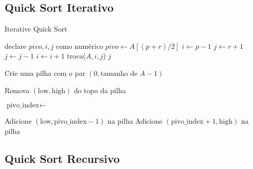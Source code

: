 \subsection{Quick Sort Iterativo}

\begin{algorithm}
	\caption{Iterative Quick Sort}
	\label{algo:iterative_quick_sort}
	\begin{algorithmic}[1]
		\Statex

		\State declare $pivo, i, j$ como numérico
		\State $pivo \gets A[(p + r) / 2]$
		\State $i \gets p - 1$
		\State $j \gets r + 1$
		\Repeat
		\State $j \gets j - 1$
		\Repeat
		\State $i \gets i + 1$
		\State troca($A, i, j$)
		\EndIf
		\EndWhile
		\State \Return $j$
		\EndFunction
		\Statex

		\State \Return
		\EndIf
		\State Crie uma pilha com o par $(0, \text{tamanho de } A - 1)$

		\State Remova $(\text{low}, \text{high})$ do topo da pilha

		\State $\text{pivo\_index} \gets$ 

		\State Adicione $(\text{low}, \text{pivo\_index} - 1)$ na pilha 
		\EndIf
		\State Adicione $(\text{pivo\_index} + 1, \text{high})$ na pilha 
		\EndIf
		\EndWhile
		\EndFunction
	\end{algorithmic}
\end{algorithm}
\FloatBarrier

\subsection{Quick Sort Recursivo}

